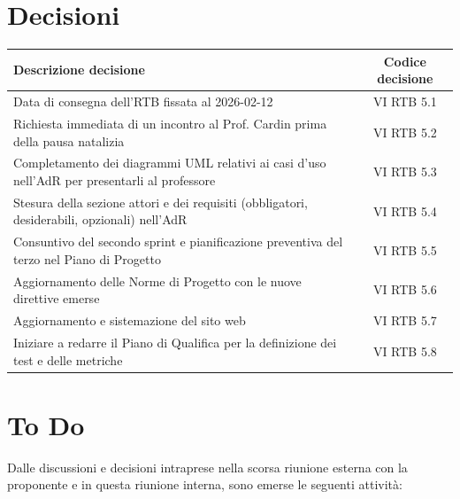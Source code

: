 \documentclass[a4paper,12pt]{article}
\begin{document}
\section{Decisioni}
\begin{center}
\small
\renewcommand{\arraystretch}{1.2} 
\begin{tabular}{|p{}|c|}
\hline
\rowcolor{gray!60} 
\textbf{Descrizione decisione} & \textbf{Codice decisione} \\
\hline
\rowcolor{white}
Data di consegna dell'RTB fissata al 2026-02-12 & VI RTB 5.1 \\
\hline
\rowcolor{gray!20}
Richiesta immediata di un incontro al Prof. Cardin prima della pausa natalizia & VI RTB 5.2 \\
\hline
\rowcolor{white}
Completamento dei diagrammi UML relativi ai casi d'uso nell'AdR per presentarli al professore & VI RTB 5.3 \\
\hline
\rowcolor{gray!20}
Stesura della sezione attori e dei requisiti (obbligatori, desiderabili, opzionali) nell'AdR & VI RTB 5.4 \\
\hline
\rowcolor{white}
Consuntivo del secondo sprint e pianificazione preventiva del terzo nel Piano di Progetto & VI RTB 5.5 \\
\hline
\rowcolor{gray!20}
Aggiornamento delle Norme di Progetto con le nuove direttive emerse & VI RTB 5.6 \\
\hline
\rowcolor{gray!20}
Aggiornamento e sistemazione del sito web & VI RTB 5.7 \\
\hline
\rowcolor{white}
Iniziare a redarre il Piano di Qualifica per la definizione dei test e delle metriche & VI RTB 5.8 \\
\hline
\end{tabular}
\end{center}

\section{To Do}
Dalle discussioni e decisioni intraprese nella scorsa riunione esterna con la proponente e in questa riunione interna, sono emerse le seguenti attività:
\end{document}
